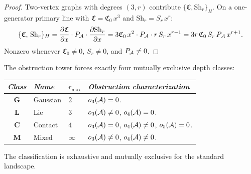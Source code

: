 \begin{proof}
Two-vertex graphs with degrees $(3, r)$ contribute
$\{\mathfrak{C}, \mathrm{Sh}_r\}_H$. On a one-generator
primary line with $\mathfrak{C} = \mathfrak{C}_0\,x^3$ and
$\mathrm{Sh}_r = S_r\,x^r$:
\begin{equation}\label{eq:thqg-cubic-source-explicit}
\{\mathfrak{C},\, \mathrm{Sh}_r\}_{H}
= \frac{\partial\mathfrak{C}}{\partial x}
 \cdot P_{\mathcal{A}} \cdot
 \frac{\partial\mathrm{Sh}_r}{\partial x}
= 3\mathfrak{C}_0\,x^2 \cdot P_{\mathcal{A}} \cdot r\,S_r\,x^{r-1}
= 3r\,\mathfrak{C}_0\,S_r\,P_{\mathcal{A}}\,x^{r+1}.
\end{equation}
Nonzero whenever $\mathfrak{C}_0 \neq 0$, $S_r \neq 0$,
and $P_{\mathcal{A}} \neq 0$.
\end{proof}

\begin{theorem}
\label{thm:thqg-four-class}
\ClaimStatusProvedHere
{}
The obstruction tower forces exactly four mutually exclusive
depth classes:
\begin{center}
\small
\renewcommand{\arraystretch}{1.15}
\begin{tabular}{clll}
\toprule
\emph{Class} & \emph{Name} & $r_{\max}$ &
\emph{Obstruction characterization} \\
\midrule
$\mathbf{G}$ & Gaussian &
 $2$ &
 $o_3(\mathcal{A}) = 0$. \\
$\mathbf{L}$ & Lie &
 $3$ &
 $o_3(\mathcal{A}) \neq 0$, $o_4(\mathcal{A}) = 0$. \\
$\mathbf{C}$ & Contact &
 $4$ &
 $o_3(\mathcal{A}) = 0$, $o_4(\mathcal{A}) \neq 0$, $o_5(\mathcal{A}) = 0$. \\
$\mathbf{M}$ & Mixed &
 $\infty$ &
 $o_3(\mathcal{A}) \neq 0$, $o_4(\mathcal{A}) \neq 0$.\\
\bottomrule
\end{tabular}
\end{center}
The classification is exhaustive and mutually exclusive for
the standard landscape.
\end{theorem}

